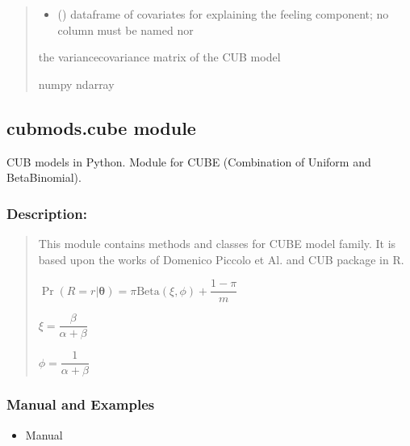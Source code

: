 \documentclass[letterpaper,10pt,english]{sphinxmanual}
\begin{document}
\begin{fulllineitems}
\begin{quote}
\begin{description}
\begin{itemize}
\item {} 
\sphinxAtStartPar
{} () \textendash{} dataframe of covariates for explaining the feeling component;
no column must be named  nor 

\end{itemize}

\sphinxAtStartPar
the variance\sphinxhyphen{}covariance matrix of the CUB model

\sphinxAtStartPar
numpy ndarray

\end{description}\end{quote}

\end{fulllineitems}



\subsection{cubmods.cube module}
\label{\detokenize{cubmods:module-cubmods.cube}}\label{\detokenize{cubmods:cubmods-cube-module}}
\sphinxAtStartPar
CUB models in Python.
Module for CUBE (Combination of Uniform
and Beta\sphinxhyphen{}Binomial).


\subsubsection{Description:}
\label{\detokenize{cubmods:id90}}\begin{quote}

\sphinxAtStartPar
This module contains methods and classes
for CUBE model family.
It is based upon the works of Domenico
Piccolo et Al. and CUB package in R.

\sphinxAtStartPar
\(\Pr(R=r|\pmb{\theta}) = \pi \mathrm{Beta}(\xi,\phi)+\dfrac{1-\pi}{m}\)

\sphinxAtStartPar
\(\xi = \dfrac{\beta}{\alpha+\beta}\)

\sphinxAtStartPar
\(\phi = \dfrac{1}{\alpha+\beta}\)
\end{quote}


\subsubsection{Manual and Examples}
\label{\detokenize{cubmods:id91}}\begin{itemize}
\item {} 
\sphinxAtStartPar
Manual 

\end{itemize}
\end{document}
